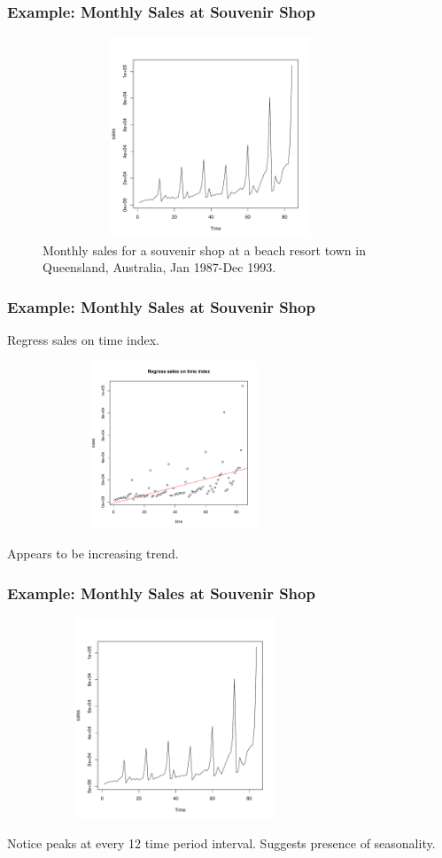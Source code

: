 \documentclass[%
xcolor=pdftex]{beamer}
\begin{document}
\begin{frame}
\frametitle{Example: Monthly Sales at Souvenir Shop}

\begin{figure} \caption{Monthly sales for a souvenir shop at a beach resort town in Queensland, Australia, Jan 1987-Dec 1993.}
\begin{center}
\includegraphics[width=100mm, height=60mm]{pics/shop.pdf}
\end{center}
\label{queensland}
\end{figure}

\end{frame}

\begin{frame}
\frametitle{Example: Monthly Sales at Souvenir Shop}

Regress sales on time index.

\includegraphics[width=100mm, height=50mm]{pics/regress.pdf}

Appears to be increasing trend.
\end{frame}

\begin{frame}
\frametitle{Example: Monthly Sales at Souvenir Shop}

\includegraphics[width=100mm, height=60mm]{pics/shop.pdf}

Notice peaks at every 12 time period interval. Suggests presence of seasonality.

\end{frame}
\end{document}
